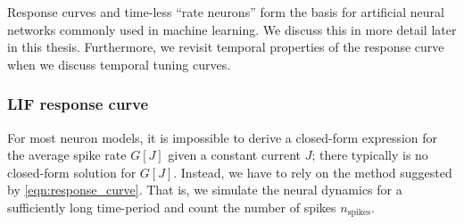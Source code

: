 Response curves and time-less \enquote{rate neurons} form the basis for artificial neural networks commonly used in machine learning. We discuss this in more detail later in this thesis.
Furthermore, we revisit temporal properties of the response curve when we discuss temporal tuning curves. %

\subsubsection{LIF response curve}
For most neuron models, it is impossible to derive a closed-form expression for the average spike rate $G[J]$ given a constant current $J$; there typically is no closed-form solution for $G[J]$. 
Instead, we have to rely on the method suggested by \cref{eqn:response_curve}.
That is, we simulate the neural dynamics for a sufficiently long time-period and count the number of spikes $n_\mathrm{spikes}$.

